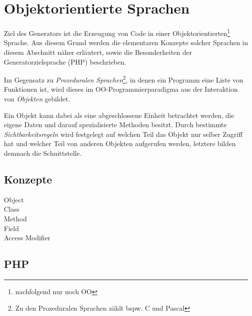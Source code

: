 \section{Objektorientierte Sprachen}
\label{sec:target_language}

Ziel des Generators ist die Erzeugung von Code in einer Objektorientierten\footnote{nachfolgend nur noch OO} Sprache. Aus diesem Grund werden die elementaren Konzepte solcher Sprachen in diesem Abschnitt näher erläutert, sowie die Besonderheiten der Generatorzielsprache (PHP) beschrieben.

Im Gegensatz zu \emph{Prozeduralen Sprachen}\footnote{Zu den Prozeduralen Sprachen zählt bspw. C und Pascal}, in denen ein Programm eine Liste von Funktionen ist, wird dieses im OO-Programmierparadigma aus der Interaktion von \emph{Objekten} gebildet. 

Ein Objekt kann dabei als eine abgeschlossene Einheit betrachtet werden, die eigene Daten und darauf spezialisierte Methoden besitzt. Durch bestimmte \emph{Sichtbarkeitsregeln} wird festgelegt auf welchen Teil das Objekt nur selber Zugriff hat und welcher Teil von anderen Objekten aufgerufen werden, letztere bilden demnach die Schnittstelle.


\subsection{Konzepte}
\label{sec:concepts_of_object_oriented_languages}


\begin{description}
    \item[Object]
    \item[Class]
    \item[Method]
    \item[Field]
    \item[Access Modifier]    
\end{description}

\subsection{PHP}
\label{sec:php}

